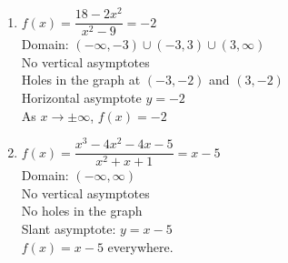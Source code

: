 \begin{multicols}{2}
\begin{enumerate}
\setcounter{enumi}{\value{HW}}

\item $f(x) = \dfrac{18-2x^2}{x^2-9} = -2$\\
Domain: $(-\infty, -3) \cup (-3,3) \cup (3, \infty)$\\
No vertical asymptotes \\
Holes in the graph at $(-3,-2)$ and $(3,-2)$ \\
Horizontal asymptote $y = -2$ \\
As $x \rightarrow \pm \infty$, $f(x) = -2$ \\

\vfill
\columnbreak

\item $f(x) = \dfrac{x^3-4x^2-4x-5}{x^2+x+1} = x-5$\\
Domain: $(-\infty, \infty)$\\
No vertical asymptotes \\
No holes in the graph \\
Slant asymptote:  $y = x-5$ \\
$f(x) = x-5$ everywhere. \\


\setcounter{HW}{\value{enumi}}
\end{enumerate}
\end{multicols}

